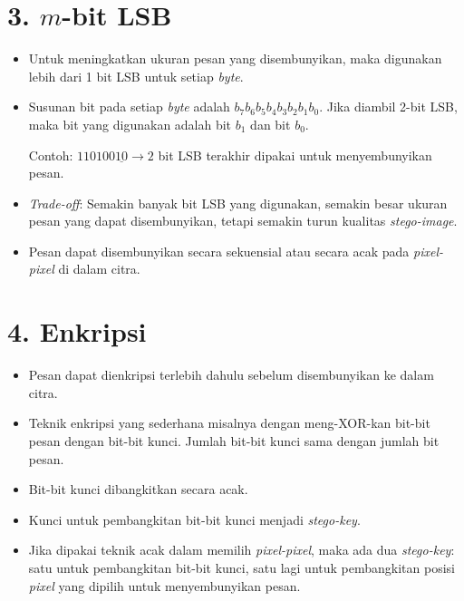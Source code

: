 \documentclass{article}
\begin{document}
\newpage


\section*{3. $m$-bit LSB}

\begin{itemize}
    \item Untuk meningkatkan ukuran pesan yang disembunyikan, maka digunakan lebih dari 1 bit LSB untuk setiap \textit{byte}.
    \item Susunan bit pada setiap \textit{byte} adalah $b_7b_6b_5b_4b_3b_2b_1b_0$. Jika diambil 2-bit LSB, maka bit yang digunakan adalah bit $b_1$ dan bit $b_0$.
    
    Contoh: $110100\underline{10} \rightarrow 2$ bit LSB terakhir dipakai untuk menyembunyikan pesan.
    
    \item \textit{Trade-off}: Semakin banyak bit LSB yang digunakan, semakin besar ukuran pesan yang dapat disembunyikan, tetapi semakin turun kualitas \textit{stego-image}.
    \item Pesan dapat disembunyikan secara sekuensial atau secara acak pada \textit{pixel-pixel} di dalam citra.
\end{itemize}

\newpage


\section*{4. Enkripsi}

\begin{itemize}
    \item Pesan dapat dienkripsi terlebih dahulu sebelum disembunyikan ke dalam citra.
    \item Teknik enkripsi yang sederhana misalnya dengan meng-XOR-kan bit-bit pesan dengan bit-bit kunci. Jumlah bit-bit kunci sama dengan jumlah bit pesan.
    \item Bit-bit kunci dibangkitkan secara acak.
    \item Kunci untuk pembangkitan bit-bit kunci menjadi \textit{stego-key}.
    \item Jika dipakai teknik acak dalam memilih \textit{pixel-pixel}, maka ada dua \textit{stego-key}: satu untuk pembangkitan bit-bit kunci, satu lagi untuk pembangkitan posisi \textit{pixel} yang dipilih untuk menyembunyikan pesan.
\end{itemize}
\end{document}
